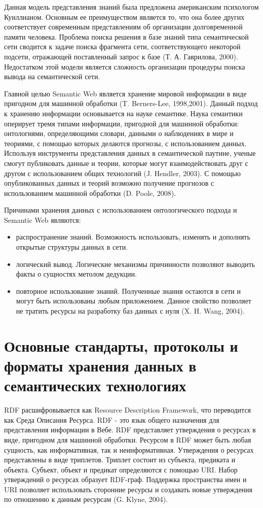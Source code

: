Данная модель представления знаний была предложена американским психологом Куиллианом. Основным ее преимуществом является то, что она более других соответствует современным представлениям об организации долговременной памяти человека. Проблема поиска решения в базе знаний типа семантической сети сводится к задаче поиска фрагмента сети, соответствующего некоторой подсети, отражающей поставленный запрос к базе (Т. А. Гаврилова, 2000). Недостатком этой модели является сложность организации процедуры поиска вывода на семантической сети.

Главной целью Semantic Web является хранение мировой информации в виде пригодном для машинной обработки (T. Berners-Lee, 1998,2001). Данный подход к хранению информации основывается на науке семантике. Наука семантики оперирует тремя типами информации, пригодной для машинной обработки: онтологиями, определяющими словари, данными о наблюдениях в мире и теориями, с помощью которых делаются прогнозы, с использованием данных. Используя инструменты представления данных в семантической паутине, ученые смогут публиковать данные и теории, которые могут взаимодействовать друг с другом с использованием общих технологий (J. Hendler, 2003). С помощью опубликованных данных и теорий возможно получение прогнозов с использованием машинной обработки (D. Poole, 2008). 

Причинами хранения данных с использованием онтологического подхода и Semantic Web являются:

\begin{itemize}
\item распространение знаний. Возможность использовать, изменять и дополнять открытые структуры данных в сети.
\item логический вывод. Логические механизмы причинности позволяют выводить факты о сущностях метолом дедукции.
\item повторное использование знаний. Полученные знания остаются в сети и могут быть использованы любым приложением. Данное свойство позволяет не тратить ресурсы на разработку баз данных с нуля (X. H. Wang, 2004). 
\end{itemize}


\section{Основные стандарты, протоколы и форматы хранения данных в семантических технологиях} \label{sect2_3}

RDF расшифровывается как Resource Description Framework, что переводится как Среда Описания Ресурса. RDF - это язык общего назначения для представления информации в Вебе. RDF представляет утверждения о ресурсах в виде, пригодном для машинной обработки. Ресурсом в RDF может быть любая сущность, как информативная, так и неинформативная. Утверждения о ресурсах представлены в виде триплетов. Триплет состоит из субъекта, предиката и объекта. Субъект, объект и предикат определяются с помощью URI. Набор утверждений о ресурсах образует RDF-граф. Поддержка пространства имен и URI позволяет использовать сторонние ресурсы и создавать новые утверждения по отношению к данным ресурсам (G. Klyne, 2004).

